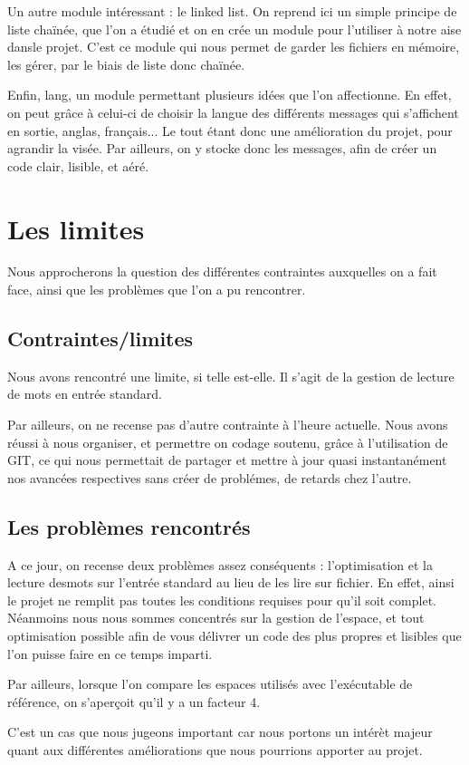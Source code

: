 \documentclass[12pt, letterpaper]{report}
\begin{document}
Un autre module intéressant : le linked list. On reprend ici un simple principe de liste chaïnée, que l'on a étudié et on en
crée un module pour l'utiliser à notre aise dansle projet. C'est ce module qui nous permet de garder
les fichiers en mémoire, les gérer, par le biais de liste donc chaïnée.

Enfin, lang, un module permettant plusieurs idées que l'on affectionne.
En effet, on peut grâce à celui-ci de choisir la langue des différents messages qui s'affichent en sortie,
anglas, français... Le tout étant donc une amélioration du projet, pour agrandir la visée.
Par ailleurs, on y stocke donc les messages, afin de créer un code clair, lisible, et aéré.


\chapter{Les limites}
Nous approcherons la question des différentes contraintes 
auxquelles on a fait face, ainsi que les problèmes que l'on a pu rencontrer.

\section{Contraintes/limites}
Nous avons rencontré une limite, si telle est-elle. Il s'agit de la gestion 
de lecture de mots en entrée standard. 

Par ailleurs, on ne recense pas d'autre contrainte à l'heure actuelle.
Nous avons réussi à nous organiser, et permettre on codage soutenu,
grâce à l'utilisation de GIT, ce qui nous permettait de partager et mettre à jour quasi instantanément nos avancées respectives sans 
créer de problémes, de retards chez l'autre.



\section{Les problèmes rencontrés}

A ce jour, on recense deux problèmes assez conséquents : l'optimisation et la lecture desmots sur l'entrée standard
au lieu de les lire sur fichier.
En effet, ainsi le projet ne remplit pas toutes les conditions requises pour qu'il soit complet. 
Néanmoins nous nous sommes concentrés sur la gestion de l'espace, et tout optimisation possible
afin de vous délivrer un code des plus propres et lisibles que l'on puisse faire 
en ce temps imparti.


Par ailleurs, lorsque l'on compare les espaces utilisés avec l'exécutable de référence, 
on s'aperçoit qu'il y a un facteur 4. 

C'est un cas que nous jugeons important car nous portons un 
intérèt majeur quant aux différentes améliorations que nous pourrions
apporter au projet.
\end{document}
